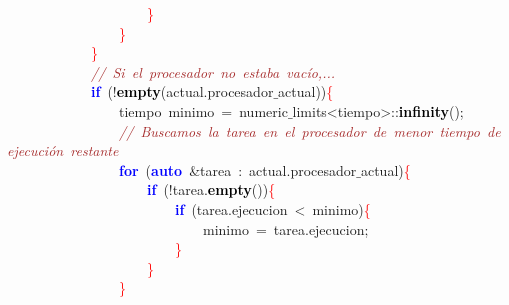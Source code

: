 \mbox{}\ \ \ \ \ \ \ \ \ \ \ \ \ \ \ \ \ \ \ \ \textcolor{Red}{\}} \\
\mbox{}\ \ \ \ \ \ \ \ \ \ \ \ \ \ \ \ \textcolor{Red}{\}} \\
\mbox{}\ \ \ \ \ \ \ \ \ \ \ \ \textcolor{Red}{\}} \\
\mbox{}\ \ \ \ \ \ \ \ \ \ \ \ \textit{\textcolor{Brown}{//\ Si\ el\ procesador\ no\ estaba\ vacío,...}} \\
\mbox{}\ \ \ \ \ \ \ \ \ \ \ \ \textbf{\textcolor{Blue}{if}}\ \textcolor{BrickRed}{(!}\textbf{\textcolor{Black}{empty}}\textcolor{BrickRed}{(}actual\textcolor{BrickRed}{.}procesador$\_$actual\textcolor{BrickRed}{))}\textcolor{Red}{\{} \\
\mbox{}\ \ \ \ \ \ \ \ \ \ \ \ \ \ \ \ \textcolor{TealBlue}{tiempo}\ minimo\ \textcolor{BrickRed}{=}\ numeric$\_$limits\textcolor{BrickRed}{\textless{}}tiempo\textcolor{BrickRed}{\textgreater{}::}\textbf{\textcolor{Black}{infinity}}\textcolor{BrickRed}{();} \\
\mbox{}\ \ \ \ \ \ \ \ \ \ \ \ \ \ \ \ \textit{\textcolor{Brown}{//\ Buscamos\ la\ tarea\ en\ el\ procesador\ de\ menor\ tiempo\ de\ ejecución\ restante}} \\
\mbox{}\ \ \ \ \ \ \ \ \ \ \ \ \ \ \ \ \textbf{\textcolor{Blue}{for}}\ \textcolor{BrickRed}{(}\textbf{\textcolor{Blue}{auto}}\ \textcolor{BrickRed}{\&}tarea\ \textcolor{BrickRed}{:}\ actual\textcolor{BrickRed}{.}procesador$\_$actual\textcolor{BrickRed}{)}\textcolor{Red}{\{} \\
\mbox{}\ \ \ \ \ \ \ \ \ \ \ \ \ \ \ \ \ \ \ \ \textbf{\textcolor{Blue}{if}}\ \textcolor{BrickRed}{(!}tarea\textcolor{BrickRed}{.}\textbf{\textcolor{Black}{empty}}\textcolor{BrickRed}{())}\textcolor{Red}{\{} \\
\mbox{}\ \ \ \ \ \ \ \ \ \ \ \ \ \ \ \ \ \ \ \ \ \ \ \ \textbf{\textcolor{Blue}{if}}\ \textcolor{BrickRed}{(}tarea\textcolor{BrickRed}{.}ejecucion\ \textcolor{BrickRed}{\textless{}}\ minimo\textcolor{BrickRed}{)}\textcolor{Red}{\{} \\
\mbox{}\ \ \ \ \ \ \ \ \ \ \ \ \ \ \ \ \ \ \ \ \ \ \ \ \ \ \ \ minimo\ \textcolor{BrickRed}{=}\ tarea\textcolor{BrickRed}{.}ejecucion\textcolor{BrickRed}{;} \\
\mbox{}\ \ \ \ \ \ \ \ \ \ \ \ \ \ \ \ \ \ \ \ \ \ \ \ \textcolor{Red}{\}} \\
\mbox{}\ \ \ \ \ \ \ \ \ \ \ \ \ \ \ \ \ \ \ \ \textcolor{Red}{\}} \\
\mbox{}\ \ \ \ \ \ \ \ \ \ \ \ \ \ \ \ \textcolor{Red}{\}} \\
